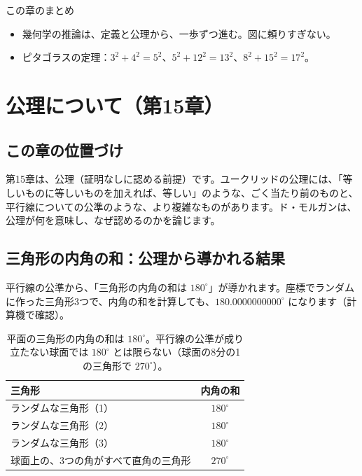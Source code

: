\documentclass[a4paper,11pt,openany]{ltjsbook}
\begin{document}
\begin{pointbox}{この章のまとめ}
\begin{itemize}[leftmargin=*]
\item 幾何学の推論は、定義と公理から、一歩ずつ進む。図に頼りすぎない。
\item ピタゴラスの定理：$3^2+4^2=5^2$、$5^2+12^2=13^2$、$8^2+15^2=17^2$。
\end{itemize}
\end{pointbox}

\chapter{公理について（第15章）}

\section{この章の位置づけ}

第15章は、公理（証明なしに認める前提）です。ユークリッドの公理には、「等しいものに等しいものを加えれば、等しい」のような、ごく当たり前のものと、平行線についての公準のような、より複雑なものがあります。ド・モルガンは、公理が何を意味し、なぜ認めるのかを論じます。

\section{三角形の内角の和：公理から導かれる結果}

平行線の公準から、「三角形の内角の和は $180^\circ$」が導かれます。座標でランダムに作った三角形3つで、内角の和を計算しても、$180.0000000000^\circ$ になります（計算機で確認）。

\begin{table}[htbp]
\centering
\begin{tabular}{lc}
\toprule
三角形 & 内角の和\\
\midrule
ランダムな三角形（1） & $180^\circ$\\
ランダムな三角形（2） & $180^\circ$\\
ランダムな三角形（3） & $180^\circ$\\
球面上の、3つの角がすべて直角の三角形 & $270^\circ$\\
\bottomrule
\end{tabular}
\caption{平面の三角形の内角の和は $180^\circ$。平行線の公準が成り立たない球面では $180^\circ$ とは限らない（球面の8分の1の三角形で $270^\circ$）。}
\end{table}
\end{document}
